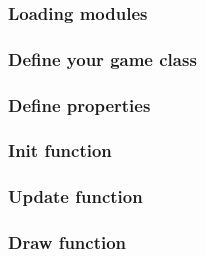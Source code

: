 \documentclass[red]{beamer}
\begin{document}
\begin{frame}
    \frametitle{Loading modules}
        \lstlllll
\end{frame}

\begin{frame}
    \frametitle{Define your game class}
        \lstllllll

\end{frame}

\begin{frame}
    \frametitle{Define properties}
        \lstlllllll
\end{frame}

\begin{frame}
    \frametitle{Init function}
        \lstllllllll
\end{frame}

\begin{frame}
    \frametitle{Update function}
        \lstlllllllll
\end{frame}

\begin{frame}
    \frametitle{Draw function}
        \lstllllllllll
\end{frame}
\end{document}
